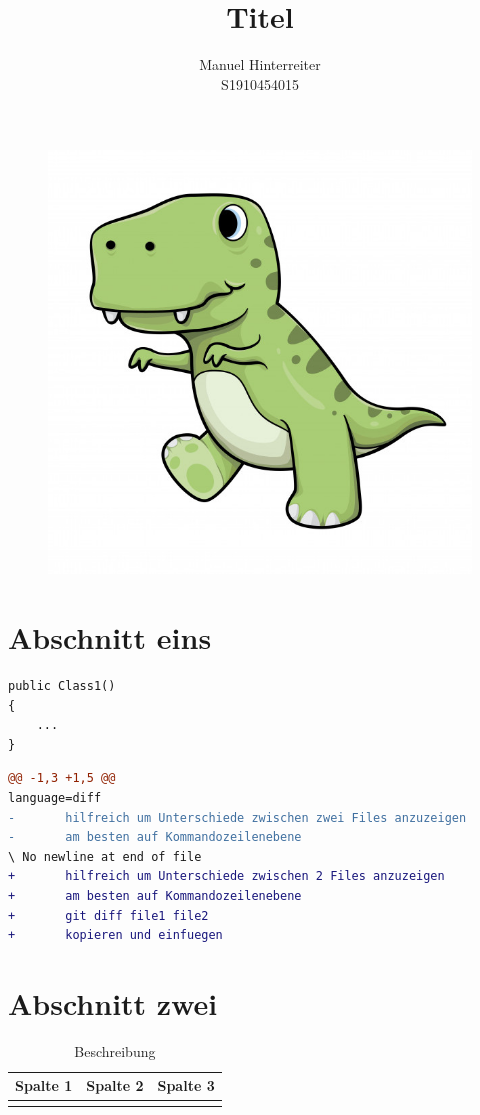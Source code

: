 \documentclass[12pt]{article}
\title{Titel} %
\author{Manuel Hinterreiter\\S1910454015}
\begin{document}
%
\maketitle

\begin{figure}[h!]
  \centering
  \includegraphics[scale=0.5]{trex}
\end{figure}

\tableofcontents
\newpage
\section{Abschnitt eins}
\begin{lstlisting}[caption=Class1.cs]
public Class1()
{
    ...
}
\end{lstlisting}

\begin{lstlisting}[language=diff, caption=Diff.cs]
@@ -1,3 +1,5 @@
language=diff
-       hilfreich um Unterschiede zwischen zwei Files anzuzeigen
-       am besten auf Kommandozeilenebene
\ No newline at end of file
+       hilfreich um Unterschiede zwischen 2 Files anzuzeigen
+       am besten auf Kommandozeilenebene
+       git diff file1 file2
+       kopieren und einfuegen
\end{lstlisting}

\section{Abschnitt zwei}
\begin{table}[h!]
  \centering
  \begin{tabular}{|p{2.5cm}||p{4cm}|p{4cm}|}
    \hline
     \textbf{Spalte 1} & \textbf{Spalte 2} & \textbf{Spalte 3} \\
     \hline
     &&\\
     \hline
   \end{tabular}
   \caption{Beschreibung}
   \label{tab:table1}
\end{table}
\end{document}
